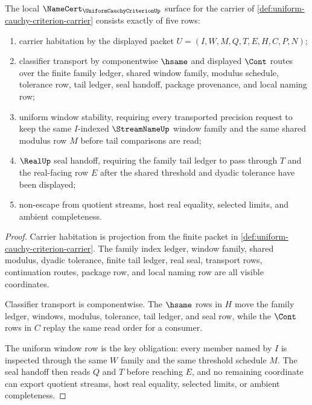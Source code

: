 \begin{theorem}
\label{thm:uniform-cauchy-criterion-namecert-obligations}
The local $\NameCert_{\UniformCauchyCriterionUp}$ surface for the carrier of \autoref{def:uniform-cauchy-criterion-carrier} consists exactly of five rows:
\begin{enumerate}
\item carrier habitation by the displayed packet $U=(I,W,M,Q,T,E,H,C,P,N)$;
\item classifier transport by componentwise $\hsame$ and displayed $\Cont$ routes over the finite family ledger, shared window family, modulus schedule, tolerance row, tail ledger, seal handoff, package provenance, and local naming row;
\item uniform window stability, requiring every transported precision request to keep the same $I$-indexed $\StreamNameUp$ window family and the same shared modulus row $M$ before tail comparisons are read;
\item $\RealUp$ seal handoff, requiring the family tail ledger to pass through $T$ and the real-facing row $E$ after the shared threshold and dyadic tolerance have been displayed;
\item non-escape from quotient streams, host real equality, selected limits, and ambient completeness.
\end{enumerate}
\end{theorem}
\begin{proof}
Carrier habitation is projection from the finite packet in \autoref{def:uniform-cauchy-criterion-carrier}. The family index ledger, window family, shared modulus, dyadic tolerance, finite tail ledger, real seal, transport rows, continuation routes, package row, and local naming row are all visible coordinates.

Classifier transport is componentwise. The $\hsame$ rows in $H$ move the family ledger, windows, modulus, tolerance, tail ledger, and seal row, while the $\Cont$ rows in $C$ replay the same read order for a consumer.

The uniform window row is the key obligation: every member named by $I$ is inspected through the same $W$ family and the same threshold schedule $M$. The seal handoff then reads $Q$ and $T$ before reaching $E$, and no remaining coordinate can export quotient streams, host real equality, selected limits, or ambient completeness.
\end{proof}

